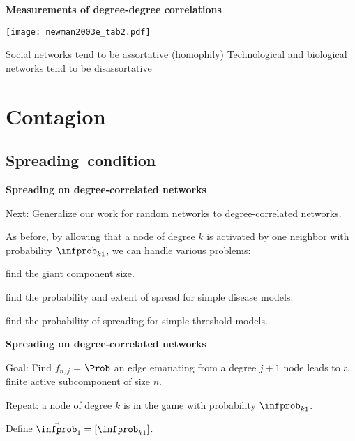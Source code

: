   



  \textbf{Measurements of degree-degree correlations}
  
  \texttt{[image: newman2003e\_tab2.pdf]}

  
   Social networks tend to be assortative (homophily)
   Technological and biological networks tend to be disassortative
  





\section{Contagion}

\subsection{Spreading\ condition}

  \textbf{Spreading on degree-correlated networks}

  
   
    Next: Generalize our work for random networks to
    degree-correlated networks.
   
    As before, by allowing that a node of degree $k$
    is activated by one neighbor with probability
    $\infprob_{k1}$, we can handle various problems:
    
     
      find the giant component size.
     
      find the probability and extent of spread
      for simple disease models.
     
      find the probability of spreading
      for simple threshold models.
    
    
  


  \textbf{Spreading on degree-correlated networks}

  
   
    \alert{Goal:} Find $f_{n,j}$ = $\Prob$ an edge 
    emanating from a degree $j+1$ node leads to
    a finite active subcomponent of size $n$.
  
    Repeat: a node of degree $k$ is in the game with
    probability $\infprob_{k1}$.
  
    Define $\vec{\infprob}_1 = [\infprob_{k1}]$.
  
